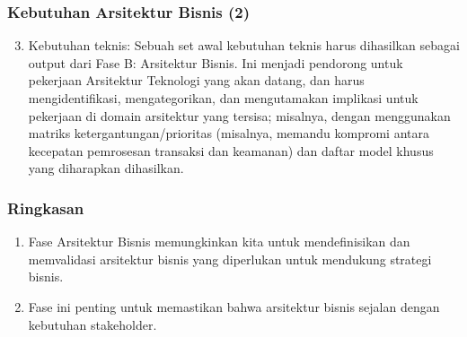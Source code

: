 \documentclass[aspectratio=169, table]{beamer}
\begin{document}
	\begin{frame}
		\frametitle{Kebutuhan Arsitektur Bisnis (2)}
		\begin{enumerate}
			\setcounter{enumi}{2}
			\item Kebutuhan teknis: Sebuah set awal kebutuhan teknis harus dihasilkan sebagai output dari Fase B: Arsitektur Bisnis. Ini menjadi pendorong untuk pekerjaan Arsitektur Teknologi yang akan datang, dan harus mengidentifikasi, mengategorikan, dan mengutamakan implikasi untuk pekerjaan di domain arsitektur yang tersisa; misalnya, dengan menggunakan matriks ketergantungan/prioritas (misalnya, memandu kompromi antara kecepatan pemrosesan transaksi dan keamanan) dan daftar model khusus yang diharapkan dihasilkan.

		\end{enumerate}
	\end{frame}


	\begin{frame}
		\frametitle{Ringkasan}
		\begin{enumerate}
			\item Fase Arsitektur Bisnis memungkinkan kita untuk mendefinisikan dan memvalidasi arsitektur bisnis yang diperlukan untuk mendukung strategi bisnis.
			\item Fase ini penting untuk memastikan bahwa arsitektur bisnis sejalan dengan kebutuhan stakeholder.
		\end{enumerate}
	\end{frame}
\end{document}
